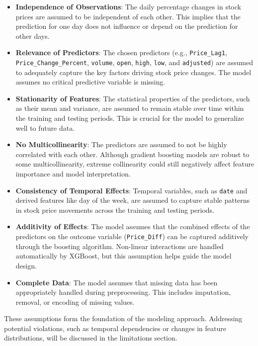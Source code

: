\documentclass[
  letterpaper,
  DIV=11,
  numbers=noendperiod]{scrartcl}
\begin{document}
\begin{itemize}
\item
  \textbf{Independence of Observations}: The daily percentage changes in
  stock prices are assumed to be independent of each other. This implies
  that the prediction for one day does not influence or depend on the
  prediction for other days.
\item
  \textbf{Relevance of Predictors}: The chosen predictors (e.g.,
  \texttt{Price\_Lag1}, \texttt{Price\_Change\_Percent},
  \texttt{volume}, \texttt{open}, \texttt{high}, \texttt{low}, and
  \texttt{adjusted}) are assumed to adequately capture the key factors
  driving stock price changes. The model assumes no critical predictive
  variable is missing.
\item
  \textbf{Stationarity of Features}: The statistical properties of the
  predictors, such as their mean and variance, are assumed to remain
  stable over time within the training and testing periods. This is
  crucial for the model to generalize well to future data.
\item
  \textbf{No Multicollinearity}: The predictors are assumed to not be
  highly correlated with each other. Although gradient boosting models
  are robust to some multicollinearity, extreme collinearity could still
  negatively affect feature importance and model interpretation.
\item
  \textbf{Consistency of Temporal Effects}: Temporal variables, such as
  \texttt{date} and derived features like day of the week, are assumed
  to capture stable patterns in stock price movements across the
  training and testing periods.
\item
  \textbf{Additivity of Effects}: The model assumes that the combined
  effects of the predictors on the outcome variable
  (\texttt{Price\_Diff}) can be captured additively through the boosting
  algorithm. Non-linear interactions are handled automatically by
  XGBoost, but this assumption helps guide the model design.
\item
  \textbf{Complete Data}: The model assumes that missing data has been
  appropriately handled during preprocessing. This includes imputation,
  removal, or encoding of missing values.
\end{itemize}

These assumptions form the foundation of the modeling approach.
Addressing potential violations, such as temporal dependencies or
changes in feature distributions, will be discussed in the limitations
section.
\end{document}
